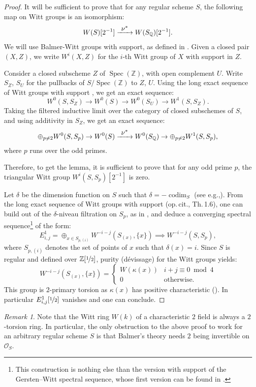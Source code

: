 \documentclass[11pt]{article}
\newcommand{\eg}{e.g.,\xspace}
\numberwithin{equation}{section}\renewcommand{\encodingdefault}{TU}
\def\To#1{\mathchoice{\xrightarrow{\textstyle\kern4pt#1\kern3pt}}{\stackrel{#1}{\longrightarrow}}{}{}}
\DeclareMathOperator{\codim}{codim}
\DeclareMathOperator{\spec}{Spec}
\newcommand{\ZZ} {\mathbb Z}
\newcommand{\ZZot} {\mathbb Z[\nicefrac 1 2]}
\newcommand{\ot} {{\nicefrac 1 2}}
\newcommand{\QQ} {\mathbb Q}
\theoremstyle{remark}
\newtheorem{rem}[thm]{Remark}
\theoremstyle{definition}
\numberwithin{equation}{thm}
\begin{document}
\begin{proof}
It will be sufficient to prove that for any regular scheme $S$, the following map on Witt groups
is an isomorphism:
\[
W(S)[2^{-1}] \To{\nu^*} W(S_\QQ)[2^{-1}].
\]
We will use Balmer-Witt groups with support, as defined in \cite[\S 1]{BalmerWitt}.
Given a closed pair $(X,Z)$, we write $W^i(X,Z)$ for the $i$-th Witt group of $X$ with support in $Z$.

Consider a closed subscheme $Z$ of $\spec(\ZZ)$, with open complement $U$.
Write $S_Z$, $S_U$ for the pullbacks of $S/\spec(\ZZ)$ to $Z$, $U$.
Using the long exact sequence of Witt groups with support \cite[1.7]{BalmerWitt},
we get an exact sequence:
\[
W^0(S,S_Z) \to W^0(S) \to W^0(S_U) \to W^1(S,S_Z).
\]
Taking the filtered inductive limit over the category of closed subschemes of $S$,
and using additivity in $S_Z$, we get an exact sequence:
\[
\oplus_{p\neq 2} W^0(S,S_p) \to W^0(S) \To{\nu^*} W^0(S_\QQ) \to \oplus_{p\neq 2} W^1(S,S_p),
\]
where $p$ runs over the odd primes.

Therefore, to get the lemma, it is sufficient to prove that for any odd prime $p$,
the triangular Witt group $W^i(S,S_p)[2^{-1}]$ is zero.

Let $\delta$ be the dimension function on $S$ such that $\delta=-\codim_S$
(see \eg \cite[\S 1.1]{BD1}).
From the long exact sequence of Witt groups with support (op.\,cit., Th.\,1.6),
one can build out of the $\delta$-niveau filtration on $S_p$,
as in \cite[\S 3.1]{BD1}, and deduce a converging spectral
sequence\footnote{This construction is nothing else than the version with support of the Gersten--Witt spectral sequence,
whose first version can be found in \cite{BalmerWalter}.} of the form:
\[
E^1_{i,j}=\oplus_{x \in S_{p,(i)}} W^{-i-j}(S_{(x)},\{x\}) \implies W^{-i-j}(S,S_p),
\]
where $S_{p,{(i)}}$ denotes the set of points of $x$ such that $\delta(x)=i$.
Since $S$ is regular and defined over $\ZZot$, purity (dévissage) for the Witt groups \cite[Th.\,6.1]{BalmerWalter} yields:
\[
W^{-i-j}(S_{(x)},\{x\})=
\begin{cases}
W(\kappa(x)) & i+j\equiv 0 \bmod 4 \\
0 & \text{otherwise.}
\end{cases}
\]
This group is $2$-primary torsion as $\kappa(x)$ has positive characteristic
(\cite[VIII\,3.2 \& 6.15]{LamQuadratic}).
In particular $E^1_{i,j}[\ot]$ vanishes and one can conclude.
\end{proof}

\begin{rem}
Note that the Witt ring $W(k)$ of a characteristic $2$ field is always a $2$-torsion ring.
In particular, the only obstruction to the above proof to work for an arbitrary regular scheme $S$
is that Balmer's theory needs $2$ being invertible on $\mathcal O_S$.
\end{rem}
\end{document}
